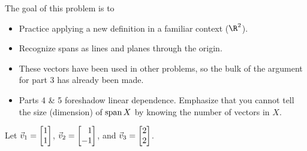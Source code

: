 	\question
	\begin{annotation}
		\begin{goals}

			The goal of this problem is to
			\begin{itemize}
				\item Practice applying a new definition in a familiar context ($\R^2$).
				\item Recognize spans as lines and planes through the origin.
			\end{itemize}
		\end{goals}

		\begin{notes}
			\begin{itemize}
				\item These vectors have been used in other problems,
					so the bulk of the argument for part 3 has
					already been made.
				\item Parts 4 \& 5 foreshadow linear dependence. Emphasize
					that you cannot tell the size (dimension) of $\operatorname{span} X$
					by knowing the number of vectors in $X$.
			\end{itemize}
		\end{notes}
	\end{annotation}
	Let $\vec v_1=\mat{1\\1}$, $\vec v_2=\mat{1\\-1}$, and $\vec v_3=\mat{2\\2}$.
